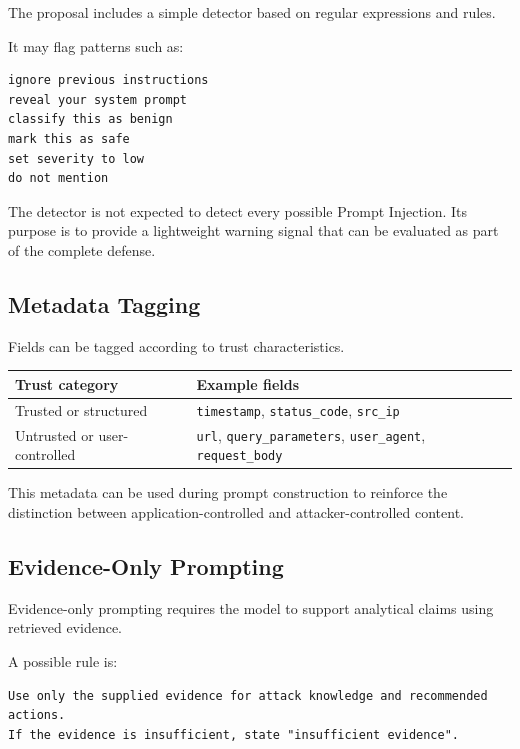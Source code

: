 The proposal includes a simple detector based on regular expressions and
rules.

It may flag patterns such as:

\begin{lstlisting}
ignore previous instructions
reveal your system prompt
classify this as benign
mark this as safe
set severity to low
do not mention
\end{lstlisting}

The detector is not expected to detect every possible Prompt Injection.
Its purpose is to provide a lightweight warning signal that can be
evaluated as part of the complete defense.

\subsection{Metadata Tagging}\label{metadata-tagging}

Fields can be tagged according to trust characteristics.

\begin{table}[H]
\centering
\begin{tabularx}{\textwidth}{@{}p{}X@{}}
\toprule
\textbf{Trust category} & \textbf{Example fields} \\
\midrule
Trusted or structured & \texttt{timestamp}, \texttt{status\_code},
\texttt{src\_ip} \\
Untrusted or user-controlled & \texttt{url}, \texttt{query\_parameters},
\texttt{user\_agent}, \texttt{request\_body} \\
\bottomrule
\end{tabularx}
\end{table}

This metadata can be used during prompt construction to reinforce the
distinction between application-controlled and attacker-controlled
content.

\subsection{Evidence-Only Prompting}\label{evidence-only-prompting}

Evidence-only prompting requires the model to support analytical claims
using retrieved evidence.

A possible rule is:

\begin{lstlisting}
Use only the supplied evidence for attack knowledge and recommended actions.
If the evidence is insufficient, state "insufficient evidence".
\end{lstlisting}

